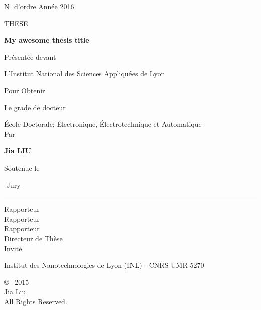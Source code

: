\begin{titlepage}
    \begin{center}
        N$^{\circ}$ d'ordre \hfill Année 2016
        \vspace*{1cm}
        
        THESE
        
        \LARGE
        \textbf{My awesome thesis title}
        
        \vspace{1cm}
        
        \small
        Présentée devant
        
        \large
        L'Institut National des Sciences Appliquées de Lyon
        
        \small
        Pour Obtenir
        
        \large
        Le grade de docteur
        
        École Doctorale: Électronique, Électrotechnique et Automatique\\ 
        \vspace{0.5cm}
        \small
        Par
        
        \Large
        \textbf{Jia LIU}

        \vspace{1 cm}
        
        \small
        Soutenue le 
        
        \vspace{0.8cm}
        
        -Jury-
        
        \noindent\rule{15cm}{0.5pt}
        
        \normalsize 
        Rapporteur\\
        Rapporteur\\
        Rapporteur\\
        Directeur de Thèse\\ 
        Invité
        
        \vfill
        
        \small
        Institut des Nanotechnologies de Lyon (INL) - CNRS UMR 5270
        
    \end{center}
    \newpage
    \thispagestyle{empty}
    \begin{center}
        \vspace*{19cm}
        \copyright~ 2015\\
        \vspace{0.2cm}
        Jia Liu\\
        \vspace{0.2cm}
        All Rights Reserved.
    \end{center}
\end{titlepage}